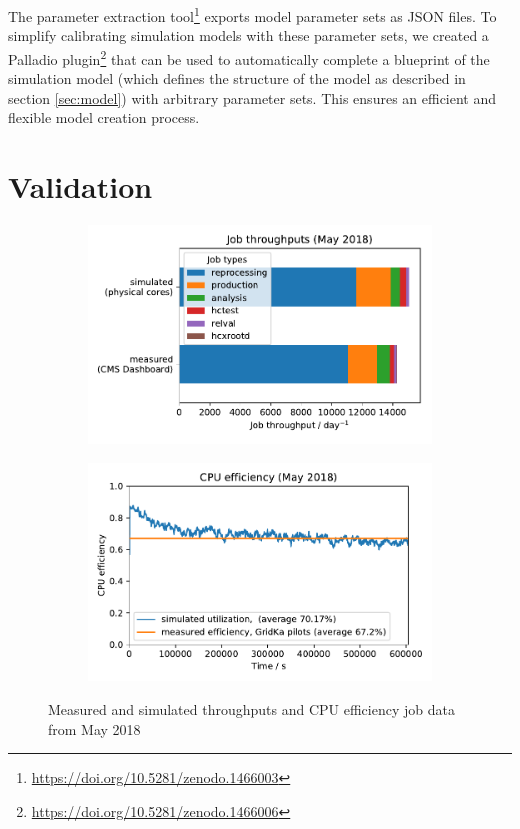 \documentclass{webofc}
\newcommand{\footurl}[1]{\footnote{\url{#1}}}
\begin{document}
The parameter extraction tool\footurl{https://doi.org/10.5281/zenodo.1466003} exports model parameter sets as JSON files.
To simplify calibrating simulation models with these parameter sets, we created a Palladio plugin\footurl{https://doi.org/10.5281/zenodo.1466006} that can be used to automatically complete a blueprint of the simulation model (which defines the structure of the model as described in section \ref{sec:model}) with arbitrary parameter sets.
This ensures an efficient and flexible model creation process.

\section{Validation}
\label{validation}

\begin{figure}[h]
	\centering
	\vspace{-10px}
	\begin{subfigure}{0.48\linewidth}
		\includegraphics[width=\linewidth]{images/validation/throughputs}
	\end{subfigure}
	\begin{subfigure}{0.48\linewidth}
		\includegraphics[width=\linewidth]{images/validation/utilizations}
	\end{subfigure}
	\vspace{-10px}
	\caption{Measured and simulated throughputs and CPU efficiency job data from May 2018}
	\label{fig:validation}
\end{figure}
\end{document}
